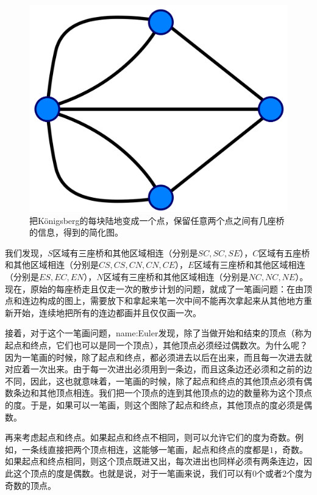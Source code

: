 \documentclass{ctexbook}
\newcommand{\FigLabel}[1]{\label{#1}}
\begin{document}
\begin{figure}
\includegraphics[width=13cm]{figure/Konigsberg4.png}
\caption[Königsberg 七桥问题示意图]{把Königsberg的每块陆地变成一个点，保留任意两个点之间有几座桥的信息，得到的简化图。}
\FigLabel{Fig:Konigsberg4}
\end{figure}

我们发现，$S$区域有三座桥和其他区域相连（分别是$SC, SC, SE$），$C$区域有五座桥和其他区域相连（分别是$CS, CS, CN, CN, CE$），$E$区域有三座桥和其他区域相连（分别是$ES, EC, EN$），$N$区域有三座桥和其他区域相连（分别是$NC, NC, NE$）。现在，原始的每座桥走且仅走一次的散步计划的问题，就成了一笔画问题：在由顶点和连边构成的图上，需要放下和拿起来笔一次中间不能再次拿起来从其他地方重新开始，连续地把所有的连边都画并且仅仅画一次。

接着，对于这个一笔画问题，\gls{name:Euler}发现，除了当做开始和结束的顶点（称为起点和终点，它们也可以是同一个顶点），其他顶点必须经过偶数次。为什么呢？因为一笔画的时候，除了起点和终点，都必须进去以后在出来，而且每一次进去就对应着一次出来。由于每一次进出必须用到一条边，而且这条边还必须和之前的边不同，因此，这也就意味着，一笔画的时候，除了起点和终点的其他顶点必须有偶数条边和其他顶点相连。我们把一个顶点的连到其他顶点的边的数量称为这个顶点的度。于是，如果可以一笔画，则这个图除了起点和终点，其他顶点的度必须是偶数。

再来考虑起点和终点。如果起点和终点不相同，则可以允许它们的度为奇数。例如，一条线直接把两个顶点相连，这能够一笔画，起点和终点的度都是$1$，奇数。如果起点和终点相同，则这个顶点既进又出，每次进出也同样必须有两条连边，因此这个顶点的度是偶数。也就是说，对于一笔画来说，我们可以有$0$个或者$2$个度为奇数的顶点。
\end{document}
